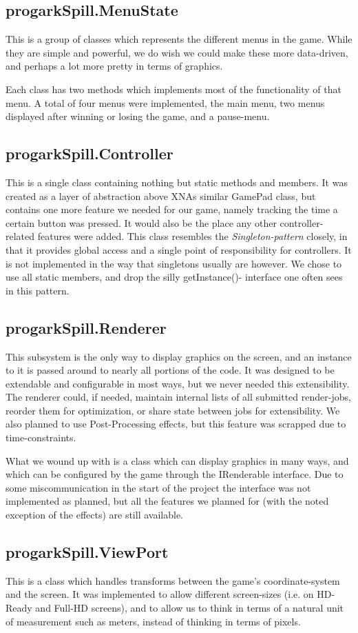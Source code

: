 \subsection{progarkSpill.MenuState}
This is a group of classes which represents the different menus in the game.
While they are simple and powerful, we do wish we could make these more
data-driven, and perhaps a lot more pretty in terms of graphics.

Each class has two methods which implements most of the functionality of that
menu. A total of four menus were implemented, the main menu, two menus 
displayed  after winning or losing the game, and a pause-menu.

\subsection{progarkSpill.Controller}
This is a single class containing nothing but static methods and members. It
was created as a layer of abstraction above XNAs similar GamePad class, but
contains one more feature we needed for our game, namely tracking the time a
certain button was pressed. It would also be the place any other controller-
related features were added. This class resembles the \emph{Singleton-pattern}
closely, in that it provides global access and a single point of responsibility
for controllers. It is not implemented in the way that singletons usually are
however. We chose to use all static members, and drop the silly getInstance()-
interface one often sees in this pattern.

\subsection{progarkSpill.Renderer}
This subsystem is the only way to display graphics on the screen, and an
instance to it is passed around to nearly all portions of the code. It was
designed to be extendable and configurable in most ways, but we never needed
this extensibility. The renderer could, if needed, maintain internal lists of
all submitted render-jobs, reorder them for optimization, or share state 
between jobs for extensibility. We also planned to use Post-Processing effects,
but this feature was scrapped due to time-constraints.

What we wound up with is a class which can display graphics in many ways, and
which can be configured by the game through the IRenderable interface. Due to
some miscommunication in the start of the project the interface was not 
implemented as planned, but all the features we planned for (with the noted
exception of the effects) are still available.

\subsection{progarkSpill.ViewPort}
This is a class which handles transforms between the game's coordinate-system
and the screen. It was implemented to allow different screen-sizes (i.e. on
HD-Ready and Full-HD screens), and to allow us to think in terms of a natural
unit of measurement such as meters, instead of thinking in terms of pixels.